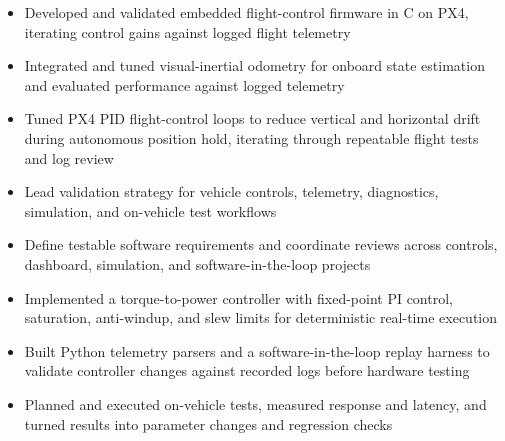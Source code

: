 \documentclass[10pt,letterpaper]{article}
\begin{document}
\bodyfont

\resumeheader
\educationsection




\begin{itemize}
  \item Developed and validated embedded flight-control firmware in C on PX4, iterating control gains against logged flight telemetry
  \item Integrated and tuned visual-inertial odometry for onboard state estimation and evaluated performance against logged telemetry
  \item Tuned PX4 PID flight-control loops to reduce vertical and horizontal drift during autonomous position hold, iterating through repeatable flight tests and log review
\end{itemize}

\entryspace

\orgline{\spartanracing}
\begin{itemize}
  \item Lead validation strategy for vehicle controls, telemetry, diagnostics, simulation, and on-vehicle test workflows
  \item Define testable software requirements and coordinate reviews across controls, dashboard, simulation, and software-in-the-loop projects
\end{itemize}

\entryspace

\orgline{\spartanracing}
\begin{itemize}
  \item Implemented a torque-to-power controller with fixed-point PI control, saturation, anti-windup, and slew limits for deterministic real-time execution
  \item Built Python telemetry parsers and a software-in-the-loop replay harness to validate controller changes against recorded logs before hardware testing
  \item Planned and executed on-vehicle tests, measured response and latency, and turned results into parameter changes and regression checks
\end{itemize}
\end{document}
